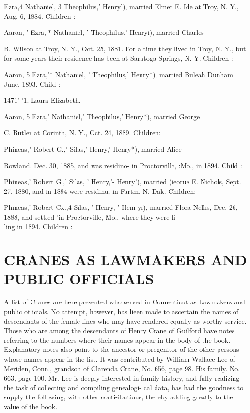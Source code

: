 \documentclass[oneside]{book}
\begin{document}
Ezra,4 Nathaniel, 3 Theophilus,' Henry'), married Elmer E. Ide 
at Troy, N. Y., Aug. 6, 1884. Children : 





Aaron, ' Ezra,'* Nathaniel, ' Theophilus,' Henryi), married Charles 

B. Wilson at Troy, N. Y., Oct. 25, 1881. For a time they lived 
in Troy, N. Y., but for some years their residence has been at 
Saratoga Springs, N. Y. Children : 




Aaron, 5 Ezra,'* Nathaniel, ' Theophilus,' Henry*), married Buleah 
Dunham, June, 1893. Child : 

1471'  '1. Laura Elizabeth. 

Aaron, 5 Ezra,' Nathaniel,' Theophilus,' Henry*), married George 

C. Butler at Corinth, N. Y., Oct. 24, 1889. Children: 



Phineas," Robert G.,' Silas,' Henry,' Henry*), married Alice 




Rowland, Dec. 30, 1885, and was residino- in Proctorvillc, :Mo., 
in 1894. Child : 


Phineas,' Robert G.,' Silas, ' Henry,'- Henry'), married (ieorue 
E. Nichols, Sept. 27, 1880, and in 1894 were residinu; in Fartm, 
N. Dak. Children: 





Phineas,' Robert Cx.,4 Silas, ' Henry, ' Hem-yi), married Flora 
Nellis, Dec. 26, 1888, and settled 'in Proctorville, Mo., where 
they were li\\'ing in 1894. Children : 




\chapter{CRANES AS LAWMAKERS AND PUBLIC OFFICIALS}



A list of Cranes are here presented who served in Connecticut 
as Lawmakers and public otiicials. No attempt, however, has 
lieen made to ascertain the names of descendants of the female 
lines who may have rendered equally as worthy service. Those 
who are among the descendants of Henry Crane of Guilford have 
notes referring to the numbers where their names appear in the 
body of the book. Explanatory notes also point to the ancestor 
or progenitor of the other persons whose names appear in the list. 
It was contributed by William Wallace Lee of Meriden, Conn., 
grandson of Clarenda Crane, No. 656, page 98. His family. No. 
663, page 100. Mr. Lee is deeply interested in family history, 
and fully realizing the task of collecting and compiling genealogi- 
cal data, has had the goodness to supply the following, with other 
conti-ibutious, thereby adding greatly to the value of the book. 
\end{document}
